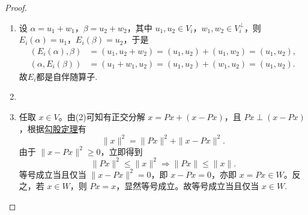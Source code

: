 \documentclass[../../main.tex]{subfiles}%
\begin{document}
\begin{proof}
\begin{enumerate}[(1)]
\item 设 $\alpha = u_1 + w_1$，$\beta = u_2 + w_2$，其中 $u_1, u_2 \in V_i$，$w_1, w_2 \in V_i^\perp$，则 $E_i(\alpha) = u_1$，$E_i(\beta) = u_2$，于是
\begin{align*}
(E_i(\alpha), \beta) &= (u_1, u_2 + w_2) = (u_1, u_2) + (u_1, w_2) = (u_1, u_2), \\
(\alpha, E_i(\beta)) &= (u_1 + w_1, u_2) = (u_1, u_2) + (w_1, u_2) = (u_1, u_2).
\end{align*}
故$E_i$都是自伴随算子.

\item 

\item 任取 \(x \in V\)。由(2)可知有正交分解 \(x = Px + (x - Px)\)，且 \(Px \perp (x - Px)\)，根据\hyperref[corollary:范数性质的相关推广-勾股定理]{勾股定理}有
\[
\|x\|^2 = \|Px\|^2 + \|x - Px\|^2.
\]
由于 \(\|x - Px\|^2 \geqslant 0\)，立即得到
\[
\|Px\|^2 \leqslant \|x\|^2 \Longrightarrow \|Px\| \leqslant \|x\|.
\]
等号成立当且仅当 \(\|x - Px\|^2 = 0\)，即 \(x - Px = 0\)，亦即 \(x = Px \in W\)。反之，若 \(x \in W\)，则 \(Px = x\)，显然等号成立。故等号成立当且仅当 \(x \in W\).
\end{enumerate}
\end{proof}
\end{document}
